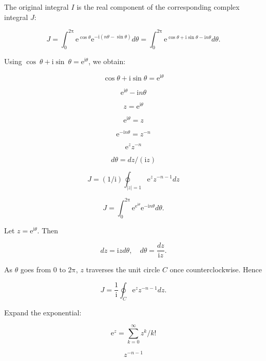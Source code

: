 \documentclass[11pt,a4paper]{article}
\theoremstyle{definition}
\theoremstyle{plain}
\begin{document}
The original integral $I$ is the real component of the corresponding complex integral $J$:

\begin{equation}
J = \int_{0}^{2\mathrm{\pi}}\mathrm{e}^{\cos \theta}\mathrm{e}^{-\mathrm{i}(n\theta - \sin \theta)} d\theta = \int_{0}^{2\mathrm{\pi}}\mathrm{e}^{\cos \theta + \mathrm{i}\sin \theta - \mathrm{i}n\theta} d\theta .
\end{equation}

Using $\cos \ \theta + \mathrm{i}\sin \ \theta = \mathrm{e}^{\mathrm{i}\theta}$, we obtain:

\begin{equation}
\cos \theta + \mathrm{i}\sin \theta = \mathrm{e}^{\mathrm{i}\theta}
\end{equation}

\[
\mathrm{e}^{\mathrm{i}\theta} - \mathrm{i}n\theta
\]

\[
z = \mathrm{e}^{\mathrm{i}\theta}
\]

\[
\mathrm{e}^{\mathrm{i}\theta} = z
\]

\[
\mathrm{e}^{-\mathrm{i}n\theta} = z^{-n}
\]

\[
\mathrm{e}^{z}z^{-n}
\]

\[
d\theta = dz/(\mathrm{i}z)
\]

\[
J = (1/\mathrm{i})\oint_{\vert{}z\vert{} = 1}\mathrm{e}^{z}z^{-n - 1}dz
\]

\[
J = \int_{0}^{2\mathrm{\pi}}\mathrm{e}^{\mathrm{e}^{\mathrm{i}\theta}}\mathrm{e}^{-\mathrm{i}n\theta} d\theta .
\]

Let $z = \mathrm{e}^{\mathrm{i}\theta}$. Then

\begin{equation}
dz = \mathrm{i}z d\theta, \quad d\theta = \frac{dz}{\mathrm{i}z}.
\end{equation}

As $\theta$ goes from 0 to $2\mathrm{\pi}$, $z$ traverses the unit circle $C$ once counterclockwise. Hence

\begin{equation}
J = \frac{1}{\mathrm{i}}\oint_{C}\mathrm{e}^{z}z^{-n - 1} dz.
\end{equation}

Expand the exponential:

\begin{equation}
\mathrm{e}^{z} = \sum_{k = 0}^{\infty}z^{k}/k!
\end{equation}

\[
z^{-n - 1}
\]
\end{document}
